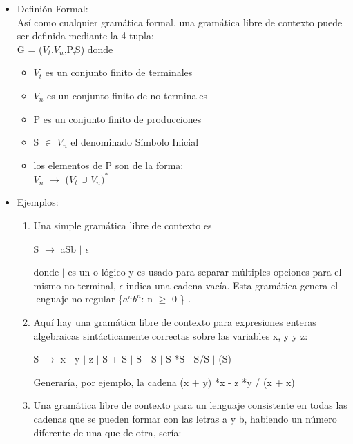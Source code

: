 \documentclass[12pt,a4paper,spanish]{book}
\begin{document}
\begin{itemize}
\item Defini\'on Formal:\\
As\'i como cualquier gram\'atica formal, una gram\'atica libre de contexto puede ser definida mediante la 4-tupla:\\

G = ($V_{t}$,$V_{n}$,P,S) donde
\begin{itemize}
\item $V_{t}$ es un conjunto finito de terminales
\item $V_{n}$ es un conjunto finito de no terminales
\item P es un conjunto finito de producciones
\item S $\in$ $V_{n}$ el denominado S\'imbolo Inicial
\item los elementos de P son de la forma:\\
        $V_{n}$ $\rightarrow$ ($V_{t}$ $\cup$ $V_{n}$$)^{*}$\\
\end{itemize}

\item Ejemplos:
\begin{enumerate}
\item Una simple gram\'atica libre de contexto es
\begin{center}
    S $\rightarrow$ aSb $\mid$ $\epsilon$\\
\end{center}
donde $\mid$ es un o l\'ogico y es usado para separar m\'ultiples opciones para el mismo no terminal, $\epsilon$ indica una cadena vac\'ia. Esta gram\'atica genera el lenguaje no regular \{$a^{n} b^{n}$: n $\ge$ 0 \} .\\
\item Aqu\'i hay una gram\'atica libre de contexto para expresiones enteras algebraicas sint\'acticamente correctas sobre las variables x, y  y z:
\begin{center}
    S $\rightarrow$ x $\mid$ y $\mid$ z $\mid$ S + S $\mid$ S - S $\mid$ S *S $\mid$ S/S $\mid$ (S)
\end{center}
Generar\'ia, por ejemplo, la cadena (x + y) *x - z *y / (x + x)\\
\item Una gram\'atica libre de contexto para un lenguaje consistente en todas las cadenas que se pueden formar con las letras a y b, habiendo un n\'umero diferente de una que de otra, ser\'ia:\\


\end{enumerate}
\end{itemize}
\end{document}

